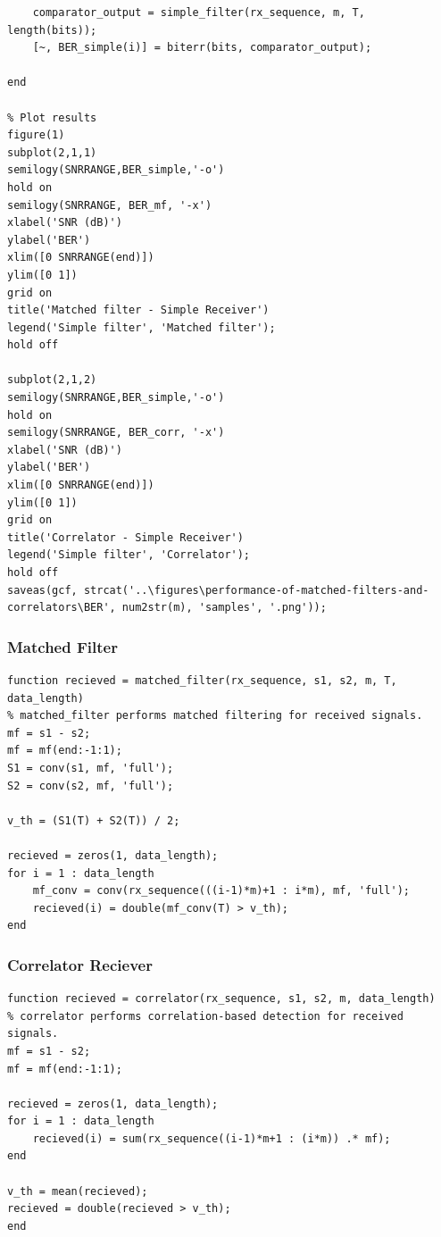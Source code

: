 \documentclass[a4paper, 12pt, english]{article}
\begin{document}
\begin{lstlisting}[style=matlab]
    % Simple filter
    comparator_output = simple_filter(rx_sequence, m, T, length(bits));
    [~, BER_simple(i)] = biterr(bits, comparator_output);
    
end

% Plot results
figure(1)
subplot(2,1,1)
semilogy(SNRRANGE,BER_simple,'-o')
hold on
semilogy(SNRRANGE, BER_mf, '-x')
xlabel('SNR (dB)')
ylabel('BER')
xlim([0 SNRRANGE(end)])
ylim([0 1])
grid on
title('Matched filter - Simple Receiver')
legend('Simple filter', 'Matched filter');
hold off

subplot(2,1,2)
semilogy(SNRRANGE,BER_simple,'-o')
hold on
semilogy(SNRRANGE, BER_corr, '-x')
xlabel('SNR (dB)')
ylabel('BER')
xlim([0 SNRRANGE(end)])
ylim([0 1])
grid on
title('Correlator - Simple Receiver')
legend('Simple filter', 'Correlator');
hold off
saveas(gcf, strcat('..\figures\performance-of-matched-filters-and-correlators\BER', num2str(m), 'samples', '.png'));
\end{lstlisting}

\subsubsection{Matched Filter}
\begin{lstlisting}[style=matlab]
function recieved = matched_filter(rx_sequence, s1, s2, m, T, data_length)
% matched_filter performs matched filtering for received signals.
mf = s1 - s2;
mf = mf(end:-1:1);
S1 = conv(s1, mf, 'full');
S2 = conv(s2, mf, 'full');

v_th = (S1(T) + S2(T)) / 2;

recieved = zeros(1, data_length);
for i = 1 : data_length
    mf_conv = conv(rx_sequence(((i-1)*m)+1 : i*m), mf, 'full');
    recieved(i) = double(mf_conv(T) > v_th);
end
\end{lstlisting}

\subsubsection{Correlator Reciever}
\begin{lstlisting}[style=matlab]
function recieved = correlator(rx_sequence, s1, s2, m, data_length)
% correlator performs correlation-based detection for received signals.
mf = s1 - s2;
mf = mf(end:-1:1);

recieved = zeros(1, data_length);
for i = 1 : data_length
    recieved(i) = sum(rx_sequence((i-1)*m+1 : (i*m)) .* mf);
end

v_th = mean(recieved);
recieved = double(recieved > v_th);
end
\end{lstlisting}
\end{document}
